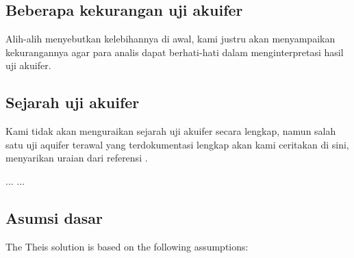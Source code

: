 \subsection{Beberapa kekurangan uji akuifer}

Alih-alih menyebutkan kelebihannya di awal, kami justru akan menyampaikan kekurangannya agar para analis dapat berhati-hati dalam menginterpretasi hasil uji akuifer.



\subsection{Sejarah uji akuifer}

Kami tidak akan menguraikan sejarah uji akuifer secara lengkap, namun salah satu uji aquifer terawal yang terdokumentasi lengkap akan kami ceritakan di sini, menyarikan uraian dari referensi \cite{kruseman1994analysis}.

...
...




\subsection{Asumsi dasar}

The Theis solution is based on the following assumptions:

